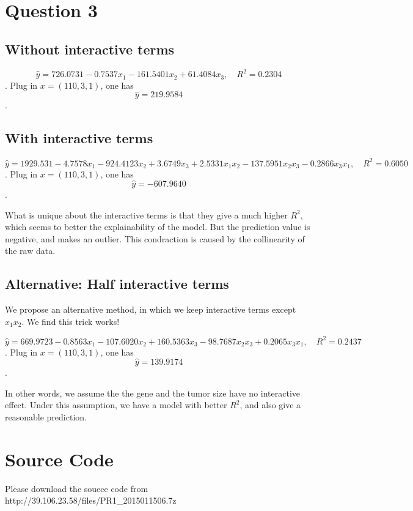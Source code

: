 \documentclass{article}
\begin{document}
\section*{Question 3}
{
    \subsection*{Without interactive terms}
    {
        $$\hat{y} = 726.0731 - 0.7537x_1 - 161.5401x_2 + 61.4084x_3, \quad R^2 = 0.2304$$.
        Plug in $x = (110, 3, 1)$, one has $$\hat{y} = 219.9584$$.
    }

    \subsection*{With interactive terms}
    {
        $$\hat{y} = 1929.531 - 4.7578x_1 - 924.4123x_2 + 3.6749x_3 + 2.5331x_1 x_2 - 137.5951x_2 x_3 - 0.2866x_3 x_1, \quad R^2 = 0.6050$$.
        Plug in $x = (110, 3, 1)$, one has $$\hat{y} = -607.9640$$.

        What is unique about the interactive terms is that they give a much higher $R^2$, which seems to better the explainability of the model. But the prediction value is negative, and makes an outlier. This condraction is caused by the collinearity of the raw data.
    }

    \subsection*{Alternative: Half interactive terms}
    {
        We propose an alternative method, in which we keep interactive terms except $x_1 x_2$. We find this trick works!

        $$\hat{y} = 669.9723 - 0.8563x_1 - 107.6020x_2 + 160.5363x_3 - 98.7687x_2 x_3 + 0.2065x_3 x_1, \quad R^2 = 0.2437$$.
        Plug in $x = (110, 3, 1)$, one has $$\hat{y} = 139.9174$$.

        In other words, we assume the the gene and the tumor size have no interactive effect. Under this assumption, we have a model with better $R^2$, and also give a reasonable prediction.
    }
}

\section*{Source Code}
{
    Please download the souece code from http://39.106.23.58/files/PR1\_2015011506.7z
}

\clearpage
\end{document}
